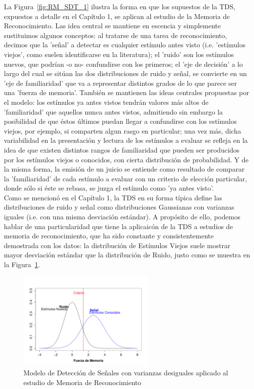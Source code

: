 La Figura~\ref{fig:RM_SDT_1} ilustra la forma en que los supuestos de la TDS, expuestos a detalle en el Capítulo 1, se aplican al estudio de la Memoria de Reconocimiento. Las idea central se mantiene en escencia y simplemente sustituimos algunos conceptos: al tratarse de una tarea de reconocimiento, decimos que la 'señal' a detectar es cualquier estímulo antes visto (i.e. 'estímulos viejos', como suelen identificarse en la literatura); el 'ruido' son los estímulos nuevos, que podrían -o no- confundirse con los primeros; el 'eje de decisión' a lo largo del cual se sitúan las dos distribuciones de ruido y señal, se convierte en un 'eje de familiaridad' que va a representar distintos grados de lo que parece ser una 'fuerza de memoria'. También se mantienen las ideas centrales propuestas por el modelo: los estímulos ya antes vistos tendrán valores más altos de 'familiaridad' que aquellos nunca antes vistos, admitiendo sin embargo la posibilidad de que éstos últimos puedan llegar a confundirse con los estímulos viejos, por ejemplo, si comparten algun rasgo en particular; una vez más, dicha variabilidad en la presentación y lectura de los estímulos a evaluar se refleja en la idea de que existen distintos rangos de familiaridad que pueden ser producidos por los estímulos viejos o conocidos, con cierta distribución de probabilidad. Y de la misma forma, la emisión de un juicio se entiende como resultado de comparar la 'familiaridad' de cada estímulo a evaluar con un criterio de elección particular, donde sólo si éste se rebasa, se juzga el estímulo como 'ya antes visto'.\\

Como se mencionó en el Capítulo 1, la TDS en su forma típica define las distribuciones de ruido y señal como distribuciones Gaussianas con varianzas iguales (i.e. con una misma desviación estándar). A propósito de ello, podemos hablar de una particularidad que tiene la aplicaicón de la TDS a estudios de memoria de reconocimiento, que ha sido constante y consistentemente demostrada con los datos: la distribución de Estímulos Viejos suele mostrar mayor desviación estándar que la distribución de Ruido, justo como se muestra en la Figura~\ref{fig:RM_SDT_2}.\\


\begin{figure}[th]
\centering
\includegraphics[width=0.60\textwidth]{Figures/RM_SDT_2} 
\decoRule
\caption[SDT en Memoria de Reconocimiento (Varianzas Desiguales)]{Modelo de Detección de Señales con varianzas desiguales aplicado al estudio de Memoria de Reconocimiento}
\label{fig:RM_SDT_2}
\end{figure}



